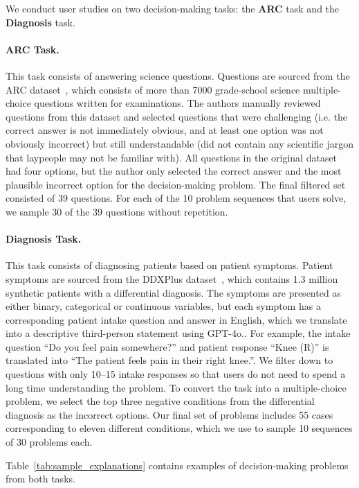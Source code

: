 We conduct user studies on two decision-making tasks: the \textbf{ARC} task and the \textbf{Diagnosis} task.

\paragraph{ARC Task.} This task consists of answering science questions. 
Questions are sourced from the ARC dataset~\cite{allenai:arc}, which consists of more than 7000 grade-school science multiple-choice questions written for examinations. 
The authors manually reviewed questions from this dataset and selected questions that were challenging (i.e. the correct answer is not immediately obvious, and at least one option was not obviously incorrect) but still understandable (did not contain any scientific jargon that laypeople may not be familiar with). 
All questions in the original dataset had four options, but the author only selected the correct answer and the most plausible incorrect option for the decision-making problem. 
The final filtered set consisted of 39 questions. 
For each of the 10 problem sequences that users solve, we sample 30 of the 39 questions without repetition.

\paragraph{Diagnosis Task.} This task consists of diagnosing patients based on patient symptoms. 
Patient symptoms are sourced from the DDXPlus dataset~\cite{fansi2022ddxplus}, which contains 1.3 million synthetic patients with a differential diagnosis. 
The symptoms are presented as either binary, categorical or continuous variables, but each symptom has a corresponding patient intake question and answer in English, which we translate into a descriptive third-person statement using GPT-4o.. 
For example, the intake question ``Do you feel pain somewhere?'' and patient response ``Knee (R)'' is translated into ``The patient feels pain in their right knee.''. 
We filter down to questions with only 10--15 intake responses so that users do not need to spend a long time understanding the problem. 
To convert the task into a multiple-choice problem, we select the top three negative conditions from the differential diagnosis as the incorrect options. 
Our final set of problems includes 55 cases corresponding to eleven different conditions, which we use to sample 10 sequences of 30 problems each.

Table~\ref{tab:sample_explanations} contains examples of decision-making problems from both tasks.